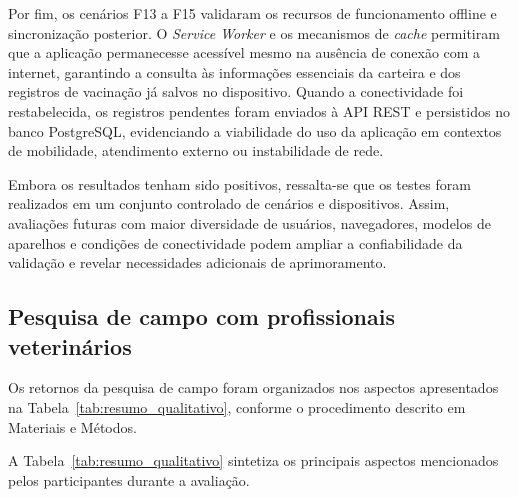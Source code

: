 \documentclass{UNESC}
\begin{document}
Por fim, os cenários F13 a F15 validaram os recursos de funcionamento offline e sincronização posterior. O \textit{Service Worker} e os mecanismos de \textit{cache} permitiram que a aplicação permanecesse acessível mesmo na ausência de conexão com a internet, garantindo a consulta às informações essenciais da carteira e dos registros de vacinação já salvos no dispositivo. Quando a conectividade foi restabelecida, os registros pendentes foram enviados à API REST e persistidos no banco PostgreSQL, evidenciando a viabilidade do uso da aplicação em contextos de mobilidade, atendimento externo ou instabilidade de rede.

Embora os resultados tenham sido positivos, ressalta-se que os testes foram realizados em um conjunto controlado de cenários e dispositivos. Assim, avaliações futuras com maior diversidade de usuários, navegadores, modelos de aparelhos e condições de conectividade podem ampliar a confiabilidade da validação e revelar necessidades adicionais de aprimoramento.

\subsection{Pesquisa de campo com profissionais veterinários}

Os retornos da pesquisa de campo foram organizados nos aspectos apresentados na Tabela~\ref{tab:resumo_qualitativo}, conforme o procedimento descrito em Materiais e Métodos.

A Tabela~\ref{tab:resumo_qualitativo} sintetiza os principais aspectos mencionados pelos participantes durante a avaliação.
\end{document}

